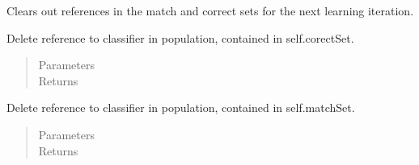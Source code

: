 \documentclass[letterpaper,10pt,english]{sphinxmanual}
\begin{document}
\begin{fulllineitems}
\begin{fulllineitems}
\label{\detokenize{eLCS:eLCS.ClassifierSet.ClassifierSet.clearSets}}
Clears out references in the match and correct sets for the next learning iteration.

\end{fulllineitems}


\begin{fulllineitems}
\label{\detokenize{eLCS:eLCS.ClassifierSet.ClassifierSet.deleteFromCorrectSet}}
Delete reference to classifier in population, contained in self.corectSet.
\begin{quote}\begin{description}
\item[{Parameters}] \leavevmode
{} \textendash{} 

\item[{Returns}] \leavevmode


\end{description}\end{quote}

\end{fulllineitems}


\begin{fulllineitems}
\label{\detokenize{eLCS:eLCS.ClassifierSet.ClassifierSet.deleteFromMatchSet}}
Delete reference to classifier in population, contained in self.matchSet.
\begin{quote}\begin{description}
\item[{Parameters}] \leavevmode
{} \textendash{} 

\item[{Returns}] \leavevmode


\end{description}\end{quote}

\end{fulllineitems}



\end{fulllineitems}
\end{document}
